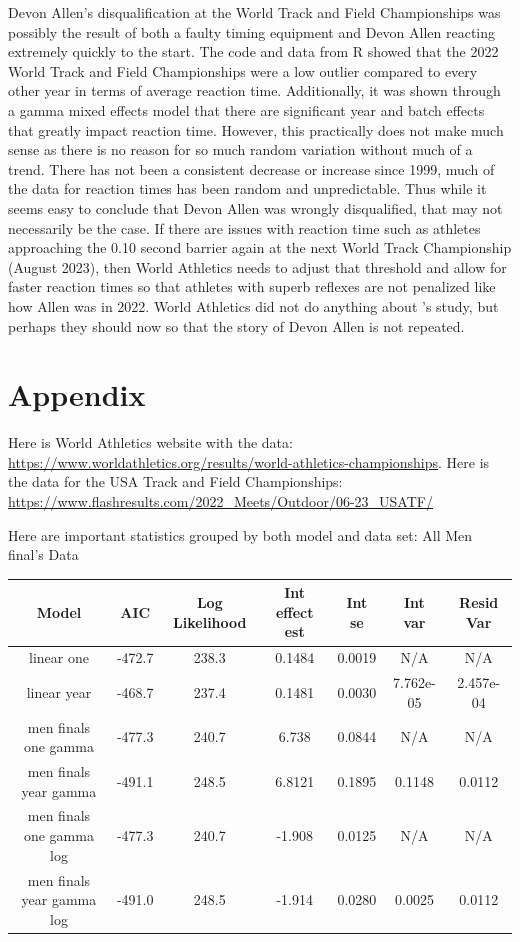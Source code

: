 \documentclass[12pt, letterpaper, titlepage]{article}
\begin{document}
Devon Allen's disqualification at the World Track and Field Championships was
possibly the result of both a faulty timing equipment and Devon Allen
reacting extremely quickly to the start.  The code and data from R showed that
the 2022 World Track and Field Championships were a low outlier compared to
every other year in terms of average reaction time.  Additionally, it was shown
through a gamma mixed effects model that there are significant year and batch
effects that greatly impact reaction time.  However, this practically does not make much sense
as there is no reason for so much random variation without much of a trend.
There has not been a consistent decrease or increase since 1999, much of the data
for reaction times has been random and unpredictable.  Thus while it seems easy
to conclude that Devon Allen was wrongly disqualified, that may not necessarily
be the case.  If there are issues with reaction time such as athletes approaching the 0.10 
second barrier again at the next World Track Championship (August 2023), then World Athletics 
needs to adjust that threshold and allow for faster reaction times so that athletes with superb 
reflexes are not penalized like how Allen was in 2022.  World Athletics did not
do anything about \citet{komi2009iaaf}'s study, but perhaps they should now so
that the story of Devon Allen is not repeated.



\section{Appendix}
\label{sec:appendix}
Here is World Athletics website with the data: \url{https://www.worldathletics.org/results/world-athletics-championships}.
Here is the data for the USA Track and Field Championships: \url{https://www.flashresults.com/2022_Meets/Outdoor/06-23_USATF/}

Here are important statistics grouped by both model and data set:
All Men final's Data
\begin{center}
  \begin{tabular}{|c | c | c | c | c | c | c |} 
   \hline\hline
   Model & AIC & Log Likelihood & Int effect est & Int se & Int var & Resid Var \\ [0.5ex] 
   \hline
   linear one & -472.7 & 238.3 & 0.1484 & 0.0019 & N/A & N/A \\ 
   \hline
   linear year & -468.7 & 237.4 & 0.1481 & 0.0030 & 7.762e-05 & 2.457e-04 \\
   \hline
   men finals one gamma & -477.3 & 240.7 & 6.738 & 0.0844 & N/A & N/A \\
   \hline
   men finals year gamma & -491.1 & 248.5 & 6.8121 & 0.1895 & 0.1148 & 0.0112 \\
   \hline
   men finals one gamma log & -477.3 & 240.7 & -1.908 & 0.0125 & N/A & N/A \\
   \hline
   men finals year gamma log & -491.0 & 248.5 & -1.914 & 0.0280 & 0.0025 & 0.0112 \\ [0.5ex]
   \hline
  \end{tabular}
\end{center}
\end{document}
